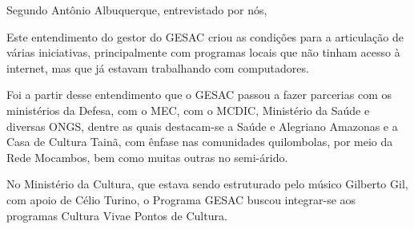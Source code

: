 \documentclass[
12pt,		%
openright,	%
twoside,  %
a4paper,			%
chapter=TITLE,		%
english,			%
french,				%
spanish,			%
brazil				%
]{USPSC-classe/USPSC}
\begin{document}
Segundo Ant\^onio Albuquerque, entrevistado por n\'os,











\noindent\begin{center}\mbox{\centering{}}\end{center}


Este entendimento do gestor do GESAC criou as condi\c{c}\~oes para a articula\c{c}\~ao de v\'arias iniciativas, principalmente com programas locais que n\~ao tinham acesso \`a internet, mas que j\'a estavam trabalhando com computadores.










Foi a partir desse entendimento que o GESAC passou a fazer parcerias com os minist\'erios da Defesa, com o MEC, com o MCDIC,  Minist\'erio da Sa\'ude e diversas ONGS, dentre as quais destacam-se a \textquotedbl Sa\'ude e Alegria\textquotedbl   no Amazonas e a \textquotedbl Casa de Cultura Tain\~a\textquotedbl , com \^enfase nas comunidades quilombolas, por meio da Rede Mocambos, bem como muitas outras no semi-\'arido.










No Minist\'erio da Cultura, que estava sendo estruturado pelo m\'usico Gilberto Gil, com apoio de C\'elio Turino, o Programa GESAC buscou integrar-se aos programas \textquotedbl Cultura Viva\textquotedbl  e \textquotedbl Pontos de Cultura\textquotedbl .
\end{document}
